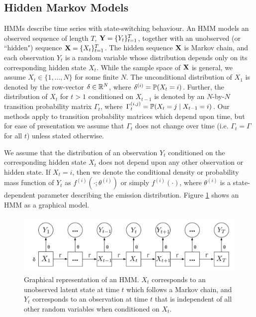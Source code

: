 \subsection{Hidden Markov Models}

HMMs describe time series with state-switching behaviour. An HMM models an observed sequence of length $T$, $\mathbf{Y} = \{Y_t\}_{t=1}^T$, together with an unobserved (or  ``hidden") sequence $\mathbf{X} = \{X_t\}_{t=1}^T$. The hidden sequence $\mathbf{X}$ is Markov chain, and each observation $Y_t$ is a random variable whose distribution depends only on its corresponding hidden state $X_t$. While the sample space of $\mathbf{X}$ is general, we assume $X_t \in \{1,\ldots,N\}$ for some finite $N$. The unconditional distribution of $X_1$ is denoted by the row-vector $\delta \in \mathbb{R}^N$, where $\delta^{(i)} = \mathbb{P}(X_t = i)$. Further, the distribution of $X_t$ for $t > 1$ conditioned on $X_{t-1}$ is denoted by an $N$-by-$N$ transition probability matrix $\Gamma_t$, where $\Gamma_t^{(i,j)} = \mathbb{P}(X_t = j \mid X_{t-1} = i)$. Our methods apply to transition probability matrices which depend upon time, but for ease of presentation we assume that $\Gamma_t$ does not change over time (i.e. $\Gamma_t = \Gamma$ for all $t$) unless stated otherwise. 

We assume that the distribution of an observation $Y_t$ conditioned on the corresponding hidden state $X_t$ does not depend upon any other observation or hidden state.
If $X_t=i$, then we denote the conditional density or probability mass function of $Y_t$ as $f^{(i)}(\cdot ; \theta^{(i)})$ or simply $f^{(i)}(\cdot)$, where $\theta^{(i)}$ is a state-dependent parameter describing the emission distribution. Figure \ref{fig:HMM} shows an HMM as a graphical model.

\begin{figure}[h]
    \centering
    \includegraphics[width=5in]{../plt/HMM.png}
    \caption{Graphical representation of an HMM. $X_t$ corresponds to an unobserved latent state at time $t$ which follows a Markov chain, and $Y_t$ corresponds to an observation at time $t$ that is independent of all other random variables when conditioned on $X_t$.}
    \label{fig:HMM}
\end{figure}

